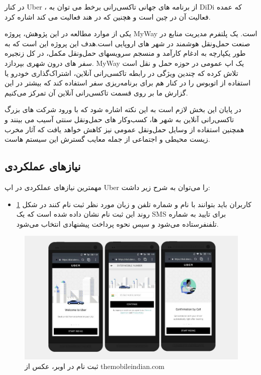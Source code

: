 در کنار Uber ، از برنامه های جهانی تاکسی‌رانی برخط می توان به DiDi که عمده فعالیت آن در چین است و هچنین  که در هند فعالیت می کند اشاره کرد.

یکی از موارد مطالعه در این پژوهش، پروژه MyWay است. یک پلتفرم مدیریت منابع در صنعت حمل‌و‌نقل هوشمند در شهر های اروپایی است.هدف این پروژه این است که به طور یکپارچه به ادغام کارآمد و منسجم  سرویسهای حمل‌و‌نقل مکمل، در کل زنجیره سفر های درون شهری بپردازد.
MyWay
یک اپ عمومی در حوزه حمل و نقل است تلاش کرده که چندین ویژگی در رابطه تاکسی‌رانی آنلاین، اشتراک‌گذاری خودرو یا استفاده از اتوبوس را در کنار هم برای برنامه‌ریزی سفر استفاده کند که بیشتر در این گزارش ما بر روی قسمت تاکسی‌رانی آنلاین آن تمرکز می‌کنیم.

در پایان این بخش لازم است به این نکته اشاره شود که با ورود شرکت های بزرگ تاکسی‌رانی آنلاین به شهر ها، کسب‌و‌کار های حمل‌و‌نقل سنتی آسیب می بینند و همچنین استفاده از وسایل حمل‌و‌نقل عمومی نیز کاهش خواهد یافت که آثار مخرب زیست محیطی و اجتماعی از جمله معایب گسترش این سیستم هاست.

\subsection{نیازهای عملکردی }

مهمترین نیازهای عملکردی در اپ Uber را می‌توان به شرح زیر داشت:

\begin{itemize}
\item 
کاربران باید بتوانند با نام و شماره تلفن و زبان مورد نظر ثبت نام کنند در شکل \ref{fig: uber1} روند این ثبت نام نشان داده شده است که یک SMS برای تایید به شماره تلفنفرستاده می‌شود و سپس نحوه پرداخت پیشنهادی انتخاب می‌شود.
\end{itemize}

\begin{figure}[htb]
\centering
\includegraphics[scale=0.3]{uber1.jpg}
\caption{ثبت نام در اوبر، عکس از themobileindian.com}
\label{fig: uber1}
\end{figure}


